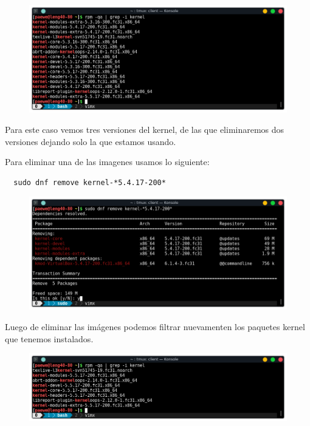\documentclass{article}
\begin{document}
\begin{figure}[h!]
  \centering
  \includegraphics[scale=0.75]{./Pictures/002_rpm_kernel.png}
\end{figure}

Para este caso vemos tres versiones del kernel, de las que eliminaremos dos
versiones dejando solo la que estamos usando.\\

\newpage

Para eliminar una de las imagenes usamos lo siguiente:

\begin{verbatim}
  sudo dnf remove kernel-*5.4.17-200*
\end{verbatim}

\begin{figure}[h!]
  \centering
  \includegraphics[scale=0.75]{./Pictures/003_dnf_remove_kernel.png}
\end{figure}

Luego de eliminar las imágenes podemos filtrar nuevamenten los paquetes kernel
que tenemos instalados.

\begin{figure}[h!]
  \centering
  \includegraphics[scale=0.75]{./Pictures/004_only_one_image.png}
\end{figure}
\end{document}
